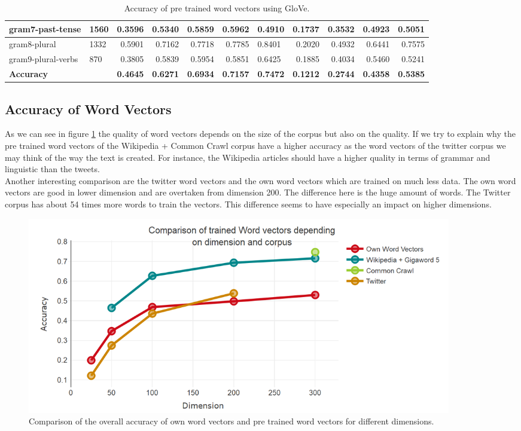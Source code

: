 \begin{landscape}
\begin{table}[!h]
\begin{tabular}{l|R{2.5cm}|r|r|r|r|R{2.5cm}|r|r|r|r}
gram7-past-tense & 1560 & 0.3596 & 0.5340 & 0.5859 & 0.5962 & 0.4910 & 0.1737 & 0.3532 & 0.4923 & 0.5051 \\ \hline
gram8-plural & 1332 & 0.5901 & 0.7162 & 0.7718 & 0.7785 & 0.8401 & 0.2020 & 0.4932 & 0.6441 & 0.7575 \\ \hline
gram9-plural-verbs & 870 & 0.3805 & 0.5839 & 0.5954 & 0.5851 & 0.6425 & 0.1885 & 0.4034 & 0.5460 & 0.5241 \\ \hline
\textbf{Accuracy} &  & \textbf{0.4645} & \textbf{0.6271} & \textbf{0.6934} & \textbf{0.7157} & \textbf{0.7472} & \textbf{0.1212} & \textbf{0.2744} & \textbf{0.4358} & \textbf{0.5385} \\ \hline
\end{tabular}
\caption{Accuracy of pre trained word vectors using GloVe.}
\end{table}
\end{landscape}

\subsection{Accuracy of Word Vectors}

As we can see in figure \ref{fig:eval-wv} the quality of word vectors depends on the
size of the corpus but also on the quality. If we try to explain why the 
pre trained word vectors of the Wikipedia + Common Crawl corpus have a higher 
accuracy as the word vectors of the twitter corpus we may think of the way the
text is created. For instance, the Wikipedia articles should have a higher quality
in terms of grammar and linguistic than the tweets. \\

Another interesting comparison are the twitter word vectors and the own word vectors
which are trained on much less data. The own word vectors are good in lower 
dimension and are overtaken from dimension 200. The difference here is the huge
amount of words. The Twitter corpus has about 54 times more words to train the 
vectors. This difference seems to have especially an impact on higher dimensions.

\begin{figure}[!h]
\centering
\includegraphics[width=0.9\textwidth]{images/eval_wv.png} 
\caption[Comparison of different word vectors.]{Comparison of the overall accuracy 
         of own word vectors and pre trained word vectors for different dimensions.}
\label{fig:eval-wv}
\end{figure}